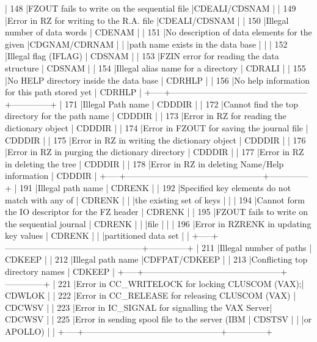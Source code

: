 \begin{XMP}
 | 148 |FZOUT fails to write on the sequential file     |CDEALI/CDSNAM |
 | 149 |Error in RZ for writing to the R.A. file        |CDEALI/CDSNAM |
 | 150 |Illegal number of data words                    |   CDENAM     |
 | 151 |No description of data elements for the given   |CDGNAM/CDRNAM |
 |     |path name exists in the data base               |              |
 | 152 |Illegal flag (IFLAG)                            |   CDSNAM     |
 | 153 |FZIN error for reading the data structure       |   CDSNAM     |
 | 154 |Illegal alias name for a directory              |   CDRALI     |
 | 155 |No HELP directory inside the data base          |   CDRHLP     |
 | 156 |No help information for this path stored yet    |   CDRHLP     |
 +-----+------------------------------------------------+--------------+
 | 171 |Illegal Path name                               |   CDDDIR     |
 | 172 |Cannot find the top directory for the path name |   CDDDIR     |
 | 173 |Error in RZ for reading the dictionary object   |   CDDDIR     |
 | 174 |Error in FZOUT for saving the journal file      |   CDDDIR     |
 | 175 |Error in RZ in writing the dictionary object    |   CDDDIR     |
 | 176 |Error in RZ in purging the dictionary directory |   CDDDIR     |
 | 177 |Error in RZ in deleting the tree                |   CDDDIR     |
 | 178 |Error in RZ in deleting Name/Help information   |   CDDDIR     |
 +-----+------------------------------------------------+--------------+
 | 191 |Illegal path name                               |   CDRENK     |
 | 192 |Specified key elements do not match with any of |   CDRENK     |
 |     |the existing set of keys                        |              |
 | 194 |Cannot form the IO descriptor for the FZ header |   CDRENK     |
 | 195 |FZOUT fails to write on the sequential journal  |   CDRENK     |
 |     |file                                            |              |
 | 196 |Error in RZRENK in updating key values          |   CDRENK     |
 |     |partitioned data set                            |              |
 +-----+------------------------------------------------+--------------+
 | 211 |Illegal number of paths                         |   CDKEEP     |
 | 212 |Illegal path name                               |CDFPAT/CDKEEP |
 | 213 |Conflicting top directory names                 |   CDKEEP     |
 +-----+------------------------------------------------+--------------+
 | 221 |Error in CC_WRITELOCK for locking CLUSCOM (VAX);|   CDWLOK     |
 | 222 |Error in CC_RELEASE for releasing CLUSCOM (VAX) |   CDCWSV     |
 | 223 |Error in IC_SIGNAL for signalling the VAX Server|   CDCWSV     |
 | 225 |Error in sending spool file to the server (IBM  |   CDSTSV     |
 |     |or APOLLO)                                      |              |
 +-----+------------------------------------------------+--------------+
\end{XMP}


